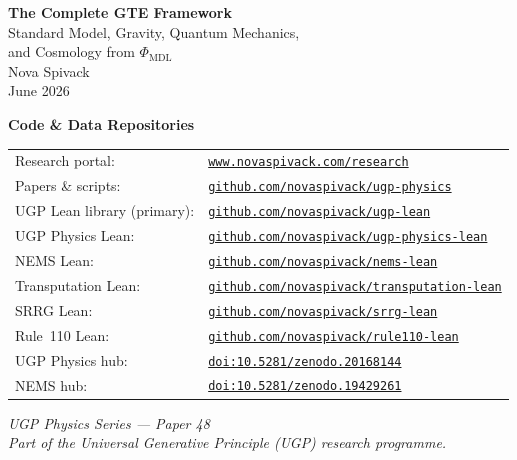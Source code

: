 \documentclass[11pt,openany]{book}
\theoremstyle{remark}
\begin{document}
\frontmatter

\begin{titlepage}
\begin{center}
\vspace*{2cm}
{\Huge\bfseries The Complete GTE Framework}\\[0.8em]
{\Large Standard Model, Gravity, Quantum Mechanics,\\[0.3em]
and Cosmology from $\Phi_{\mathrm{MDL}}$}\\[2.5em]
{\large Nova Spivack}\\[1.5em]
{\normalsize June 2026}\\[3em]
\NovaZenodoAfterTitle

\vspace{1.2em}
\begin{center}
{\small\bfseries Code \& Data Repositories}\\[0.5em]
{\small
\begin{tabular}{@{}ll@{}}
Research portal: & \href{https://www.novaspivack.com/research}{\texttt{www.novaspivack.com/research}}\\[4pt]
Papers \& scripts: & \href{https://github.com/novaspivack/ugp-physics}{\texttt{github.com/novaspivack/ugp-physics}}\\[2pt]
UGP Lean library (primary): & \href{https://github.com/novaspivack/ugp-lean}{\texttt{github.com/novaspivack/ugp-lean}}\\[2pt]
UGP Physics Lean: & \href{https://github.com/novaspivack/ugp-physics-lean}{\texttt{github.com/novaspivack/ugp-physics-lean}}\\[2pt]
NEMS Lean: & \href{https://github.com/novaspivack/nems-lean}{\texttt{github.com/novaspivack/nems-lean}}\\[2pt]
Transputation Lean: & \href{https://github.com/novaspivack/transputation-lean}{\texttt{github.com/novaspivack/transputation-lean}}\\[2pt]
SRRG Lean: & \href{https://github.com/novaspivack/srrg-lean}{\texttt{github.com/novaspivack/srrg-lean}}\\[2pt]
Rule~110 Lean: & \href{https://github.com/novaspivack/rule110-lean}{\texttt{github.com/novaspivack/rule110-lean}}\\[4pt]
UGP Physics hub: & \href{https://doi.org/10.5281/zenodo.20168144}{\texttt{doi:10.5281/zenodo.20168144}}\\[2pt]
NEMS hub: & \href{https://doi.org/10.5281/zenodo.19429261}{\texttt{doi:10.5281/zenodo.19429261}}\\
\end{tabular}
}
\end{center}

\vfill
{\small\itshape UGP Physics Series --- Paper 48}\\[0.3em]
{\small\itshape Part of the Universal Generative Principle (UGP) research programme.}
\end{center}
\end{titlepage}
\end{document}
